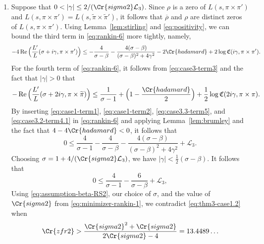 \documentclass[12pt,reqno]{amsart}
\renewcommand{\tilde}{\widetilde}
\theoremstyle{remark}
\renewcommand{\tilde}{\widetilde}
\DeclareMathOperator{\Real}{Re}
\renewcommand{\tilde}{\widetilde}
\newcommand{\Q}{\mathbb{Q}}
\numberwithin{equation}{section}
\begin{document}
\begin{enumerate}[ leftmargin=1cm]
	
    \item  Suppose that $0 < |\gamma| \le {2}/({\Cr{sigma2}\mathcal{L}_3})$.
	Since $\rho$ is a zero of $L(s, \pi \times \pi')$ and  $L(s, \pi \times \pi') = L(s, \tilde{\pi} \times \tilde{\pi}')$, it follows that $\overline{\rho}$ and $\rho$ are distinct zeros of  $L(s, \pi \times \pi')$. Using Lemma~\ref{lem:stirling} and \eqref{eq:positivity}, we can bound the third term in \eqref{eq:rankin-6} more tightly, namely,
	\begin{multline}\label{eq:case3.3-term5}
			- 4\Real\Big(\frac{L'}{L}(\sigma + i\gamma, \pi \times \pi') \Big) \le -\frac{4}{\sigma-\beta}-\frac{4(\sigma-\beta)}{(\sigma-\beta)^2+4\gamma^2}-2\Cr{hadamard}
            + 2\log \mathfrak{C}(i\gamma, \pi \times \pi').
	\end{multline}
    For the fourth term of \eqref{eq:rankin-6}, it follows from  \eqref{eq:case3-term3} and the fact that $|\gamma| >0$ that
    \begin{equation}\label{eq:case3.2-term4.1}
		-\Real\Big(\frac{L'}{L}(\sigma + 2i\gamma, \pi \times \tilde{\pi}) \Big) \le  \frac{1}{\sigma-1} + \Big(1-\frac{\Cr{hadamard}}{2}\Big) + \frac{1}{2}\log \mathfrak{C}(2i\gamma, \pi \times \pi).
	\end{equation}
    By inserting \eqref{eq:case1-term1}, \eqref{eq:case1-term2}, \eqref{eq:case3.3-term5}, and 
    \eqref{eq:case3.2-term4.1} in \eqref{eq:rankin-6} and applying Lemma~\ref{lem:brumley} and the fact that $4-4\Cr{hadamard} < 0$, it follows that
    \begin{equation*}
        0 \le \frac{4}{\sigma-1}-\frac{4}{\sigma-\beta} - \frac{4(\sigma-\beta)}{(\sigma-\beta)^2+4\gamma^2} + \mathcal{L}_3. %
    \end{equation*}
    Choosing $\sigma = 1 + 4/(\Cr{sigma2}\mathcal{L}_3)$, we have $|\gamma| < \frac{1}{2}(\sigma - \beta)$. It follows that
    \begin{equation}\label{eq:thm3-case1.2}
    0 \le \frac{4}{\sigma-1}-\frac{6}{\sigma-\beta} + \mathcal{L}_3, %
    \end{equation}
   Using \eqref{eq:assumption-beta-RS2}, our choice of $\sigma$, and the value of $\Cr{sigma2}$ from \eqref{eq:minimizer-rankin-1}, we contradict \eqref{eq:thm3-case1.2} when  \[
   \Cr{zfr2} > \frac{\Cr{sigma2}^2+\Cr{sigma2}}{2\Cr{sigma2}-4} = 13.4489\ldots
   \]
	

\end{enumerate}
\end{document}
